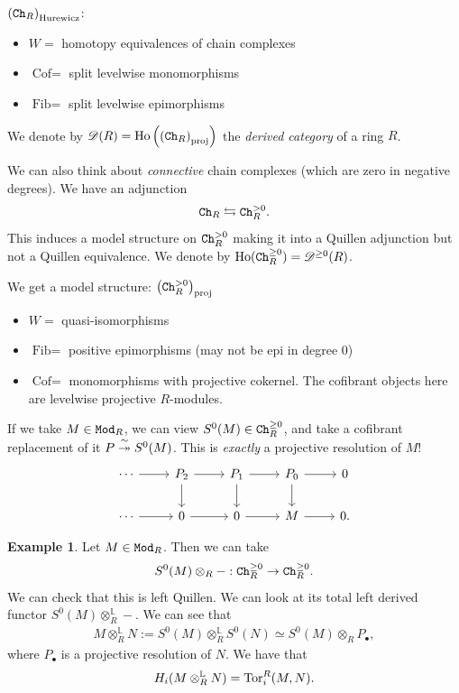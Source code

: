 \documentclass[12pt]{amsart}
\theoremstyle{definition}
\newtheorem{example}[theorem]{Example}
\providecommand{\Cof}{\text{Cof}}
\providecommand{\Fib}{\text{Fib}}
\begin{document}
$\left( \texttt{Ch}_R \right)_\text{Hurewicz}$:
\begin{itemize}
    \item $W=$ homotopy equivalences of chain complexes
    \item $\Cof=$ split levelwise monomorphisms
    \item $\Fib=$ split levelwise epimorphisms
\end{itemize}

We denote by $\mathscr{D}(R) = \text{Ho} \left( \left( \texttt{Ch}_R \right)_\text{proj} \right)$ the \textit{derived category} of a ring $R$.

We can also think about \textit{connective} chain complexes (which are zero in negative degrees). We have an adjunction
\begin{align*}
    \texttt{Ch}_R \leftrightarrows \texttt{Ch}_R^{>0}.
\end{align*}
This induces a model structure on $\texttt{Ch}_R^{>0}$ making it into a Quillen adjunction but not a Quillen equivalence. We denote by $\text{Ho}(\texttt{Ch}_R^{\ge 0}) = \mathscr{D}^{\ge 0}(R)$.

We get a model structure:
$\left( \texttt{Ch}_R^{>0} \right)_\text{proj}$
\begin{itemize}
    \item $W=$ quasi-isomorphisms
    \item $\Fib=$ positive epimorphisms (may not be epi in degree 0)
    \item $\Cof=$ monomorphisms with projective cokernel. The cofibrant objects here are levelwise projective $R$-modules.
\end{itemize}


If we take $M \in \texttt{Mod}_R$, we can view $S^0(M) \in \texttt{Ch}_R^{\ge 0}$, and take a cofibrant replacement of it $P \overset{\sim}{\twoheadrightarrow} S^0(M)$. This is \textit{exactly} a projective resolution of $M$!
\[ \begin{tikzcd}
    \cdots\rar & P_2\dar\rar & P_1\dar\rar & P_0\dar\rar & 0\\
    \cdots \rar & 0\rar & 0\rar & M\rar & 0.
\end{tikzcd} \]
%
\begin{example} Let $M \in \texttt{Mod}_R$. Then we can take
\begin{align*}
    S^0(M) \otimes_R - : \texttt{Ch}_R^{\ge 0} \to \texttt{Ch}_R^{\ge 0}.
\end{align*}
We can check that this is left Quillen. We can look at its total left derived functor $S^0(M) \otimes_R^{\mathbb{L}} -$. We can see that
\begin{align*}
    M \otimes_R^{\mathbb{L}} N := S^0(M) \otimes_R^{\mathbb{L}} S^0(N) \simeq S^0(M) \otimes_R P_\bullet,
\end{align*}
where $P_\bullet$ is a projective resolution of $N$. We have that
\begin{align*}
    H_i(M \otimes_R^{\mathbb{L}} N) = \text{Tor}_i^R(M,N).
\end{align*}
\end{example}
\end{document}
